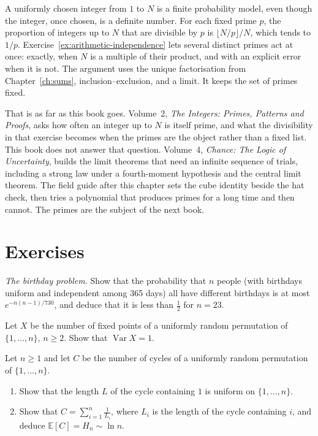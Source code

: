 A uniformly chosen integer from $1$ to $N$ is a finite probability model, even though the integer, once chosen, is a definite number. For each fixed prime $p$, the proportion of integers up to $N$ that are divisible by $p$ is $\lfloor N/p\rfloor/N$, which tends to $1/p$. Exercise~\ref{ex:arithmetic-independence} lets several distinct primes act at once: exactly, when $N$ is a multiple of their product, and with an explicit error when it is not. The argument uses the unique factorisation from Chapter~\ref{ch:sums}, inclusion--exclusion, and a limit. It keeps the set of primes fixed.

That is as far as this book goes. Volume~2, \emph{The Integers: Primes, Patterns and Proofs}, asks how often an integer up to $N$ is itself prime, and what the divisibility in that exercise becomes when the primes are the object rather than a fixed list. This book does not answer that question. Volume~4, \emph{Chance: The Logic of Uncertainty}, builds the limit theorems that need an infinite sequence of trials, including a strong law under a fourth-moment hypothesis and the central limit theorem. The field guide after this chapter sets the cube identity beside the hat check, then tries a polynomial that produces primes for a long time and then cannot. The primes are the subject of the next book.

\section{Exercises}

\begin{exercise}[$\star$]\label{ex:birthday}
\emph{The birthday problem.} Show that the probability that $n$ people (with birthdays uniform and independent among 365 days) all have different birthdays is at most
$e^{-n(n-1)/730}$, and deduce that it is less than $\frac12$ for $n=23$.
\end{exercise}

\begin{exercise}[$\star\star$]\label{ex:fixedvar}
Let $X$ be the number of fixed points of a uniformly random permutation of $\{1,\dots,n\}$, $n\ge2$. Show that $\operatorname{Var}X=1$.
\end{exercise}

\begin{exercise}[$\star\star$]\label{ex:cycles}
Let $n\ge1$ and let $C$ be the number of cycles of a uniformly random permutation of $\{1,\dots,n\}$.
\begin{enumerate}[label=(\alph*)]
\item Show that the length $L$ of the cycle containing $1$ is uniform on $\{1,\dots,n\}$.
\item Show that $C=\sum_{i=1}^n\frac1{L_i}$, where $L_i$ is the length of the cycle containing $i$, and deduce $\mathbb E[C]=H_n\sim\ln n$.
\end{enumerate}
\end{exercise}

